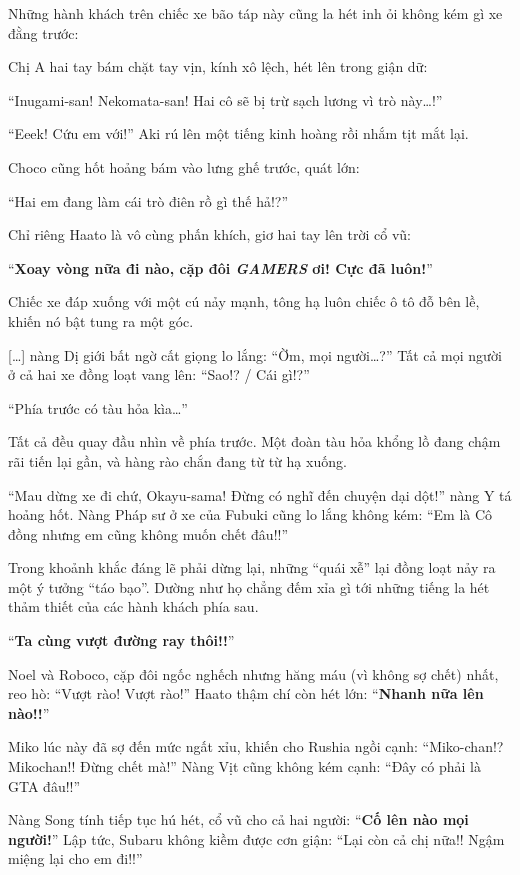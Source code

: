 \documentclass[../main.tex]{subfiles}
\begin{document}
Những hành khách trên chiếc xe bão táp này cũng la hét inh ỏi không kém gì xe đằng trước:

Chị A hai tay bám chặt tay vịn, kính xô lệch, hét lên trong giận dữ:

``Inugami-san! Nekomata-san! Hai cô sẽ bị trừ sạch lương vì trò này\dots!''

``Eeek! Cứu em với!'' Aki rú lên một tiếng kinh hoàng rồi nhắm tịt mắt lại.

Choco cũng hốt hoảng bám vào lưng ghế trước, quát lớn:

``Hai em đang làm cái trò điên rồ gì thế hả!?''

Chỉ riêng Haato là vô cùng phấn khích, giơ hai tay lên trời cổ vũ:

``\textbf{Xoay vòng nữa đi nào, cặp đôi \textit{GAMERS} ơi! Cực đã luôn!}''

Chiếc xe đáp xuống với một cú nảy mạnh, tông hạ luôn chiếc ô tô đỗ bên lề, khiến nó bật tung ra một góc.

    [\dots] nàng Dị giới bất ngờ cất giọng lo lắng: ``Ờm, mọi người\dots?'' Tất cả mọi người ở cả hai xe đồng loạt vang lên: ``Sao!? / Cái gì!?''

``Phía trước có tàu hỏa kìa\dots''

Tất cả đều quay đầu nhìn về phía trước. Một đoàn tàu hỏa khổng lồ đang chậm rãi tiến lại gần, và hàng rào chắn đang từ từ hạ xuống.

``Mau dừng xe đi chứ, Okayu-sama! Đừng có nghĩ đến chuyện dại dột!'' nàng Y tá hoảng hốt. Nàng Pháp sư ở xe của Fubuki cũng lo lắng không kém: ``Em là Cô đồng nhưng em cũng không muốn chết đâu!!''

Trong khoảnh khắc đáng lẽ phải dừng lại, những ``quái xễ'' lại đồng loạt nảy ra một ý tưởng ``táo bạo''. Dường như họ chẳng đếm xỉa gì tới những tiếng la hét thảm thiết của các hành khách phía sau.

``\textbf{Ta cùng vượt đường ray thôi!!}''

Noel và Roboco, cặp đôi ngốc nghếch nhưng hăng máu (vì không sợ chết) nhất, reo hò: ``Vượt rào! Vượt rào!'' Haato thậm chí còn hét lớn: ``\textbf{Nhanh nữa lên nào!!}''

Miko lúc này đã sợ đến mức ngất xỉu, khiến cho Rushia ngồi cạnh: ``Miko-chan!? Mikochan!! Đừng chết mà!'' Nàng Vịt cũng không kém cạnh: ``Đây có phải là GTA đâu!!''

Nàng Song tính tiếp tục hú hét, cổ vũ cho cả hai người: ``\textbf{Cố lên nào mọi người!}'' Lập tức, Subaru không kiềm được cơn giận: ``Lại còn cả chị nữa!! Ngậm miệng lại cho em đi!!''
\end{document}

